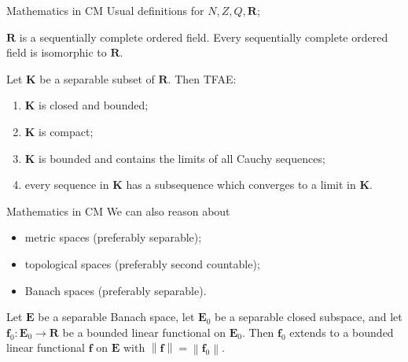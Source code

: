 \documentclass{beamer}
\begin{document}
\begin{frame}{Mathematics in $\mathrm{CM}$}
  Usual definitions for $N, Z, Q, \mathbf{R}$;

  \begin{theorem}[$\mathrm{CM}$]
    $\mathbf{R}$ is a sequentially complete ordered field. Every sequentially complete ordered field is isomorphic to $\mathbf{R}$.
  \end{theorem}

  \begin{theorem}[$\mathrm{CM}$]
    Let $\mathbf{K}$ be a separable subset of $\mathbf{R}$. Then TFAE:
    \begin{enumerate}[label=(\roman*)]
      \item $\mathbf{K}$ is closed and bounded;
      \item $\mathbf{K}$ is compact;
      \item $\mathbf{K}$ is bounded and contains the limits of all Cauchy sequences;
      \item every sequence in $\mathbf{K}$ has a subsequence which converges to a limit in $\mathbf{K}$.
    \end{enumerate}
  \end{theorem}
\end{frame}

\begin{frame}{Mathematics in $\mathrm{CM}$}
  We can also reason about
  \begin{itemize}
    \item metric spaces (preferably separable);
    \item topological spaces (preferably second countable);
    \item Banach spaces (preferably separable).
  \end{itemize}

  \vspace*{8pt}

  \begin{theorem}
    \justifying
    Let $\mathbf{E}$ be a separable Banach space, let $\mathbf{E}_0$ be a separable closed subspace, and let $\mathbf{f}_0 : \mathbf{E}_0 \rightarrow \mathbf{R}$ be a bounded linear functional on $\mathbf{E}_0$. Then $\mathbf{f}_0$ extends to a bounded linear functional $\mathbf{f}$ on $\mathbf{E}$ with $\left\|\mathbf{f}\right\| = \left\|\mathbf{f}_0\right\|$.
  \end{theorem}
\end{frame}
\end{document}
